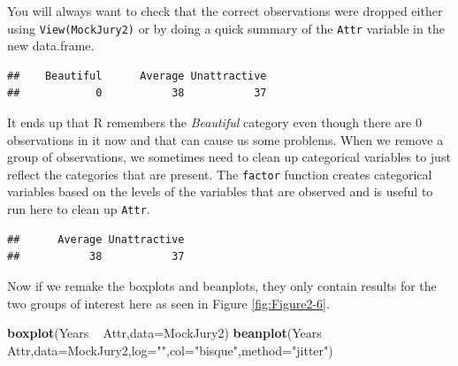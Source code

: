 \documentclass[]{book}
\newenvironment{Shaded}{\begin{snugshade}}{\end{snugshade}}
\newcommand{\KeywordTok}[1]{\textcolor[rgb]{0.13,0.29,0.53}{\textbf{{#1}}}}
\newcommand{\DataTypeTok}[1]{\textcolor[rgb]{0.13,0.29,0.53}{{#1}}}
\newcommand{\StringTok}[1]{\textcolor[rgb]{0.31,0.60,0.02}{{#1}}}
\newcommand{\NormalTok}[1]{{#1}}
\begin{document}
You will always want to check that the correct observations were dropped
either using \texttt{View(MockJury2)} or by doing a quick summary of the
\texttt{Attr} variable in the new data.frame.

\begin{Shaded}
\end{Shaded}

\begin{verbatim}
##    Beautiful      Average Unattractive 
##            0           38           37
\end{verbatim}

It ends up that R remembers the \emph{Beautiful} category even though
there are 0 observations in it now and that can cause us some problems.
When we remove a group of observations, we sometimes need to clean up
categorical variables to just reflect the categories that are present.
The \texttt{factor} function creates categorical variables based on the
levels of the variables that are observed and is useful to run here to
clean up \texttt{Attr}.

\begin{Shaded}
\end{Shaded}

\begin{verbatim}
##      Average Unattractive 
##           38           37
\end{verbatim}

Now if we remake the boxplots and beanplots, they only contain results
for the two groups of interest here as seen in Figure
\ref{fig:Figure2-6}.




\begin{Shaded}
\begin{Highlighting}[]
\KeywordTok{boxplot}\NormalTok{(Years ~}\StringTok{ }\NormalTok{Attr,}\DataTypeTok{data=}\NormalTok{MockJury2) }
\KeywordTok{beanplot}\NormalTok{(Years ~}\StringTok{ }\NormalTok{Attr,}\DataTypeTok{data=}\NormalTok{MockJury2,}\DataTypeTok{log=}\StringTok{""}\NormalTok{,}\DataTypeTok{col=}\StringTok{"bisque"}\NormalTok{,}\DataTypeTok{method=}\StringTok{"jitter"}\NormalTok{)}
\end{Highlighting}
\end{Shaded}
\end{document}
